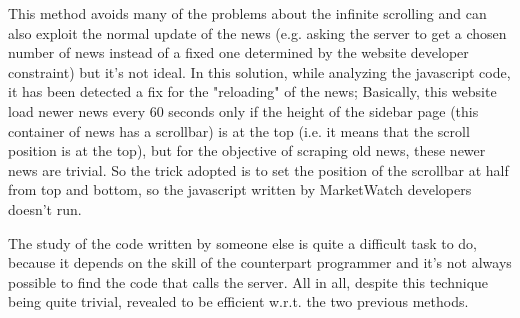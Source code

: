 This method avoids many of the problems about the infinite scrolling and can also exploit the normal update of the news (e.g. asking the server to get a chosen number of news instead of a fixed one determined by the website developer constraint) but it's not ideal. 
In this solution, while analyzing the javascript code, it has been detected a fix for the "reloading" of the news; Basically, this website load newer news every 60 seconds only if the height of the sidebar page (this container of news has a scrollbar) is at the top (i.e. it means that the scroll position is at the top), but for the objective of scraping old news, these newer news are trivial. So the trick adopted is to set the position of the scrollbar at half from top and bottom, so the javascript written by MarketWatch developers doesn't run.
\par
The study of the code written by someone else is quite a difficult task to do, because it depends on the skill of the counterpart programmer and it's not always possible to find the code that calls the server. All in all, despite this technique being quite trivial, revealed to be efficient w.r.t. the two previous methods.
\par
